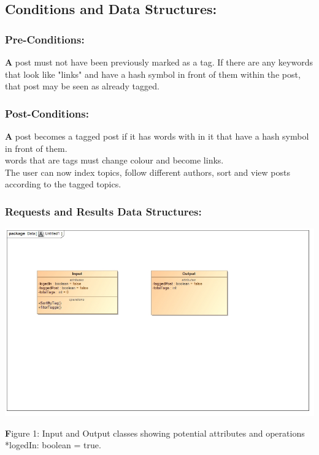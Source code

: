 \documentclass[a4paper,11pt]{article}
\begin{document}
\subsection{Conditions and Data Structures:}
\subsubsection*{Pre-Conditions:}
\textbf A post must not have been previously marked as a tag. If there are any keywords that look like "links" and have a hash symbol in front of them within the post, that post may be seen as already tagged.
\subsubsection*{Post-Conditions:}
\textbf A post becomes a tagged post if it has words with in it that have a hash symbol in front of them.
\\ words that are tags must change colour and become links.
\\The user can now index topics, follow different authors, sort and view posts according to the tagged topics.

\subsubsection*{Requests and Results Data Structures:}

\begin{center}
\includegraphics[width=0.9\linewidth]{Images/SocialTagging/Tag_Input_Output_ClassDiagram}
\end{center}

\textbf Figure 1: Input and Output classes showing potential attributes and operations *logedIn: boolean = true.
\end{document}
